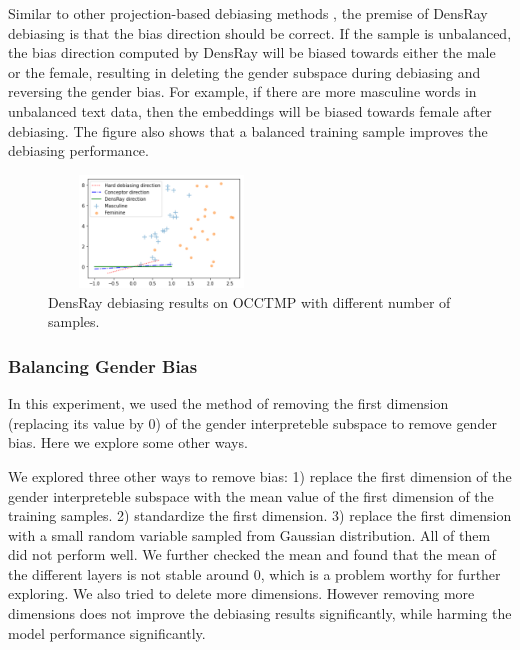 Similar to other projection-based debiasing methods
, the premise of DensRay debiasing is
that the bias direction should be correct. If the sample is
unbalanced, the bias direction computed by DensRay will be
biased towards either the male or the female, resulting in
deleting the gender subspace during debiasing and reversing
the gender bias. For example, if there are more masculine words in
unbalanced text data, then the embeddings will be biased
towards female after debiasing. The figure also shows that
a balanced training sample improves the debiasing
performance.
\begin{figure}[ht]
    \centering
    \includegraphics[width=6cm,height=3cm]{samples}
    \caption{DensRay debiasing results on OCCTMP with different number of samples.}
\end{figure}

\subsubsection{Balancing Gender Bias}
In this experiment, we used the method of removing the first dimension (replacing its value by $0$) of the gender interpreteble subspace to remove gender bias. Here we explore some other ways.

We explored three other ways to remove bias: 1) replace the first dimension of the gender interpreteble subspace with the mean value of the first dimension of the training samples. 2) standardize the first dimension. 3) replace the first dimension with a small random variable sampled from Gaussian distribution. All of them did not perform well. We further checked the mean and found that the mean of the different layers is not stable around 0, which is a problem worthy for further exploring. We also tried to delete more dimensions. However removing more dimensions does not improve the debiasing results significantly, while harming the model performance significantly.


